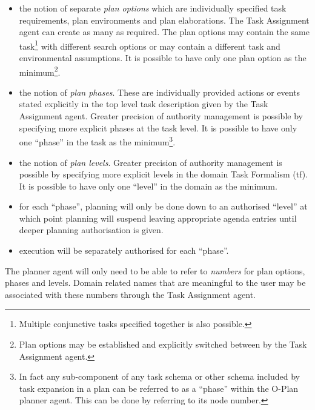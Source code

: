 \begin{itemize}

\item
{} 
the notion of separate {\em plan options} which are individually
specified task requirements, plan environments and plan elaborations.  The Task
Assignment agent can create as many as required.  The plan options may contain
the same task\footnote{Multiple conjunctive tasks specified together is
also possible.} with different search options or may contain a different
task and environmental assumptions.  It is possible to have only one plan
option as the minimum\footnote{Plan options may be established and explicitly
switched between by the Task Assignment agent.}.

\item
{} 
the notion of {\em plan phases}.  These are
individually provided actions or events stated explicitly in the top level
task description given by the Task Assignment agent.  Greater precision
of authority management is possible by specifying more explicit phases at the
task level.  It is possible to have only one ``phase'' in the task as the
minimum\footnote{In fact any sub-component of any task schema or other schema
included by task expansion in a plan can be referred to as a ``phase''
within the O-Plan planner agent.  This can be done by referring to
its node number.}.

\item
{} 
the notion of {\em plan levels}.   Greater precision
of authority management is possible by specifying more explicit levels in
the domain Task Formalism ({\sc tf}). It is possible to have only one ``level''
in the domain as the minimum.

\item for each ``phase'', planning will only be done down to an authorised
``level'' at which point planning will suspend leaving appropriate agenda
entries until deeper planning authorisation is given.

\item execution will be separately authorised for each ``phase''.

\end{itemize}

The planner agent will only need to be able to refer to {\em numbers\/} for
plan options, phases and levels.  Domain related names that are meaningful
to the user may be associated with these numbers through the Task Assignment
agent.

